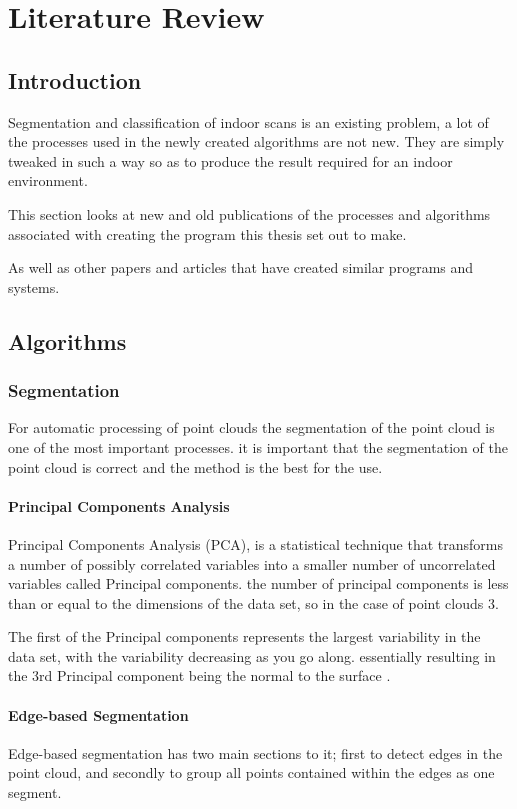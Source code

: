 \chapter{Literature Review}

\section{Introduction}
	Segmentation and classification of indoor scans is an existing problem, a lot of the processes used in the newly created algorithms are not new. They are simply tweaked in such a way so as to produce the result required for an indoor environment. 
	
	This section looks at new and old publications of the processes and algorithms associated with creating the program this thesis set out to make.
	
	As well as other papers and articles that have created similar programs and systems.
	
\section{Algorithms}
	\subsection{Segmentation}
		For automatic processing of point clouds the segmentation of the point cloud is one of the most important processes. it is important that the segmentation of the point cloud is correct and the method is the best for the use.
		
		\subsubsection{Principal Components Analysis}
		Principal Components Analysis (PCA), is a statistical technique that transforms a number of possibly correlated variables into a smaller number of uncorrelated variables called Principal components. the number of principal components is less than or equal to the dimensions of the data set, so in the case of point clouds 3.
		
		The first of the Principal components represents the largest variability in the data set, with the variability decreasing as you go along. essentially resulting in the 3rd Principal component being the normal to the surface \citep{dunteman_principal_1989}. 
		
		
		\subsubsection{Edge-based Segmentation}
		Edge-based segmentation has two main sections to it; first to detect edges in the point cloud, and secondly to group all points contained within the edges as one segment.
		

